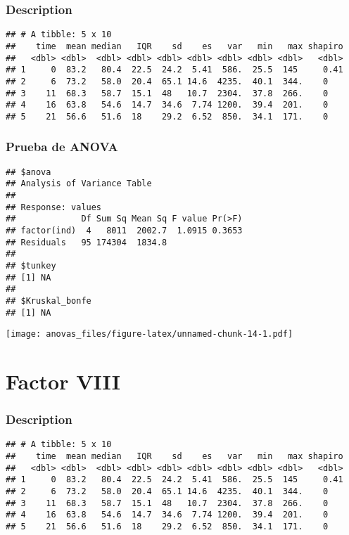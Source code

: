 \documentclass[
]{article}
\begin{document}
\hypertarget{description-6}{%
\subsubsection{Description}\label{description-6}}

\begin{verbatim}
## # A tibble: 5 x 10
##    time  mean median   IQR    sd    es   var   min   max shapiro
##   <dbl> <dbl>  <dbl> <dbl> <dbl> <dbl> <dbl> <dbl> <dbl>   <dbl>
## 1     0  83.2   80.4  22.5  24.2  5.41  586.  25.5  145     0.41
## 2     6  73.2   58.0  20.4  65.1 14.6  4235.  40.1  344.    0   
## 3    11  68.3   58.7  15.1  48   10.7  2304.  37.8  266.    0   
## 4    16  63.8   54.6  14.7  34.6  7.74 1200.  39.4  201.    0   
## 5    21  56.6   51.6  18    29.2  6.52  850.  34.1  171.    0
\end{verbatim}

\hypertarget{prueba-de-anova-6}{%
\subsubsection{Prueba de ANOVA}\label{prueba-de-anova-6}}

\begin{verbatim}
## $anova
## Analysis of Variance Table
## 
## Response: values
##             Df Sum Sq Mean Sq F value Pr(>F)
## factor(ind)  4   8011  2002.7  1.0915 0.3653
## Residuals   95 174304  1834.8               
## 
## $tunkey
## [1] NA
## 
## $Kruskal_bonfe
## [1] NA
\end{verbatim}

\texttt{[image: anovas\_files/figure-latex/unnamed-chunk-14-1.pdf]}

\hypertarget{factor-viii}{%
\section{Factor VIII}\label{factor-viii}}

\hypertarget{description-7}{%
\subsubsection{Description}\label{description-7}}

\begin{verbatim}
## # A tibble: 5 x 10
##    time  mean median   IQR    sd    es   var   min   max shapiro
##   <dbl> <dbl>  <dbl> <dbl> <dbl> <dbl> <dbl> <dbl> <dbl>   <dbl>
## 1     0  83.2   80.4  22.5  24.2  5.41  586.  25.5  145     0.41
## 2     6  73.2   58.0  20.4  65.1 14.6  4235.  40.1  344.    0   
## 3    11  68.3   58.7  15.1  48   10.7  2304.  37.8  266.    0   
## 4    16  63.8   54.6  14.7  34.6  7.74 1200.  39.4  201.    0   
## 5    21  56.6   51.6  18    29.2  6.52  850.  34.1  171.    0
\end{verbatim}
\end{document}
